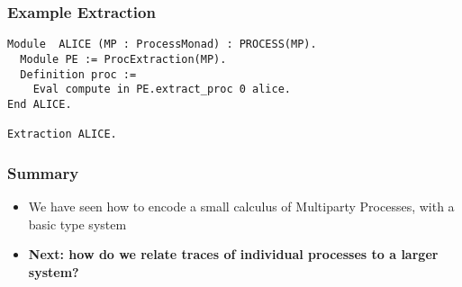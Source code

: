 \begin{frame}
\frametitle{Example Extraction}
\begin{verbatim}
Module  ALICE (MP : ProcessMonad) : PROCESS(MP).
  Module PE := ProcExtraction(MP).
  Definition proc :=
    Eval compute in PE.extract_proc 0 alice.
End ALICE.

Extraction ALICE.
\end{verbatim}
\end{frame}

\begin{frame}
\frametitle{Summary}
\begin{sticky}
\begin{itemize}
\item We have seen how to encode a small calculus of Multiparty Processes, with a basic type system
\item \textbf{Next: how do we relate traces of individual processes to a larger system?}
\end{itemize}
\end{sticky}
\end{frame}
